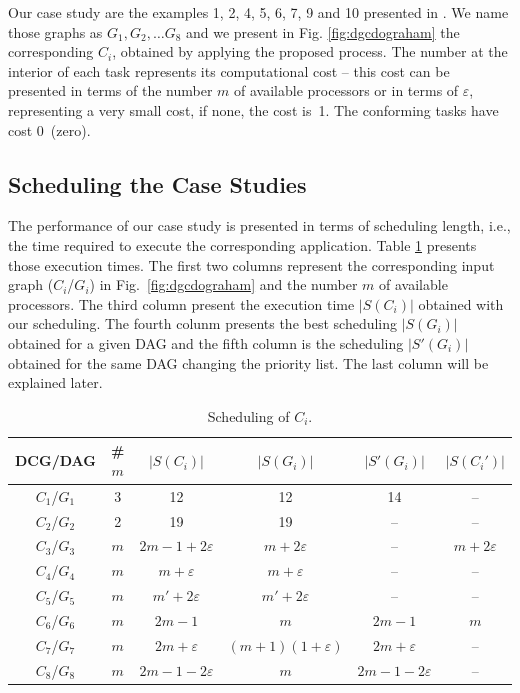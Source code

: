 \documentclass[twocolumn]{svjour3}
\begin{document}
Our case study are the examples 1, 2, 4, 5, 6, 7, 9 and 10 presented in \cite{Graham76}. We name those graphs as $G_1, G_2, \dots G_8$ and we present in Fig. \ref{fig:dgcdograham} the corresponding $C_i$, obtained by applying the proposed process. The number at the interior of each task represents its computational cost – this cost can be presented in terms of the number $m$ of available processors or in terms of $\varepsilon$, representing a very small cost, if none, the cost is~1. The conforming tasks have cost 0~(zero).

\subsection{Scheduling the Case Studies}

The performance of our case study is presented in terms of scheduling length, i.e., the time required to execute the corresponding application. Table \ref{tab:resultados} presents those execution times. The first two columns represent the corresponding input graph ($C_i$/$G_i$) in Fig.~\ref{fig:dgcdograham} and the number $m$ of available processors. The third column present the execution time $|S(C_i)|$ obtained with our scheduling. The fourth colunm presents the best scheduling $|S(G_i)|$ obtained for a given DAG and the fifth column is the scheduling $|S'(G_i)|$ obtained for the same DAG changing the priority list. The last column will be explained later.

\begin{table}
\begin{center}
\caption{Scheduling of $C_i$.}\label{tab:resultados}
\begin{tabular}{c|c||c||c|c||c}
DCG/DAG & \# $m$ & $|S(C_i)|$ & $|S(G_i)|$ & $|S'(G_i)|$ & $|S(C_i')|$\\ \hline\hline
$C_1$/$G_1$ &  3  & 12 & 12 & 14 & --\\ \hline
$C_2$/$G_2$ &  2  & 19 & 19 & -- & --\\ \hline
$C_3$/$G_3$ & $m$ & $2m-1+2\varepsilon$ & $m+2\varepsilon$ & -- & $m+2\varepsilon$ \\ \hline
$C_4$/$G_4$ & $m$ & $m+\varepsilon$ & $m+\varepsilon$ & -- & --\\ \hline
$C_5$/$G_5$ & $m$ & $m'+2\varepsilon$ & $m'+2\varepsilon$  & -- & --\\ \hline
$C_6$/$G_6$ & $m$ & $2m-1$ & $m$ & $2m-1$ & $m$\\ \hline
$C_7$/$G_7$ & $m$ & $2m+\varepsilon$ & $(m+1)(1+\varepsilon)$ & $2m+\varepsilon$ & --\\ \hline
$C_8$/$G_8$ & $m$ & $2m-1-2\varepsilon$ & $m$ & $2m-1-2\varepsilon$ & --\\ \hline
\end{tabular}
\end{center}
\end{table}
\end{document}
